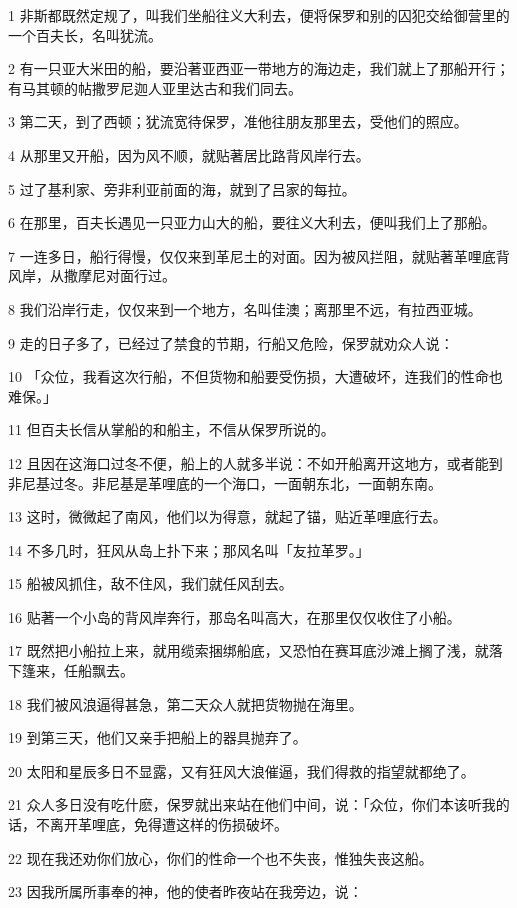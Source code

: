 \par 1 非斯都既然定规了，叫我们坐船往义大利去，便将保罗和别的囚犯交给御营里的一个百夫长，名叫犹流。
\par 2 有一只亚大米田的船，要沿著亚西亚一带地方的海边走，我们就上了那船开行；有马其顿的帖撒罗尼迦人亚里达古和我们同去。
\par 3 第二天，到了西顿；犹流宽待保罗，准他往朋友那里去，受他们的照应。
\par 4 从那里又开船，因为风不顺，就贴著居比路背风岸行去。
\par 5 过了基利家、旁非利亚前面的海，就到了吕家的每拉。
\par 6 在那里，百夫长遇见一只亚力山大的船，要往义大利去，便叫我们上了那船。
\par 7 一连多日，船行得慢，仅仅来到革尼土的对面。因为被风拦阻，就贴著革哩底背风岸，从撒摩尼对面行过。
\par 8 我们沿岸行走，仅仅来到一个地方，名叫佳澳；离那里不远，有拉西亚城。
\par 9 走的日子多了，已经过了禁食的节期，行船又危险，保罗就劝众人说：
\par 10 「众位，我看这次行船，不但货物和船要受伤损，大遭破坏，连我们的性命也难保。」
\par 11 但百夫长信从掌船的和船主，不信从保罗所说的。
\par 12 且因在这海口过冬不便，船上的人就多半说：不如开船离开这地方，或者能到非尼基过冬。非尼基是革哩底的一个海口，一面朝东北，一面朝东南。
\par 13 这时，微微起了南风，他们以为得意，就起了锚，贴近革哩底行去。
\par 14 不多几时，狂风从岛上扑下来；那风名叫「友拉革罗。」
\par 15 船被风抓住，敌不住风，我们就任风刮去。
\par 16 贴著一个小岛的背风岸奔行，那岛名叫高大，在那里仅仅收住了小船。
\par 17 既然把小船拉上来，就用缆索捆绑船底，又恐怕在赛耳底沙滩上搁了浅，就落下篷来，任船飘去。
\par 18 我们被风浪逼得甚急，第二天众人就把货物抛在海里。
\par 19 到第三天，他们又亲手把船上的器具抛弃了。
\par 20 太阳和星辰多日不显露，又有狂风大浪催逼，我们得救的指望就都绝了。
\par 21 众人多日没有吃什麽，保罗就出来站在他们中间，说：「众位，你们本该听我的话，不离开革哩底，免得遭这样的伤损破坏。
\par 22 现在我还劝你们放心，你们的性命一个也不失丧，惟独失丧这船。
\par 23 因我所属所事奉的神，他的使者昨夜站在我旁边，说：
